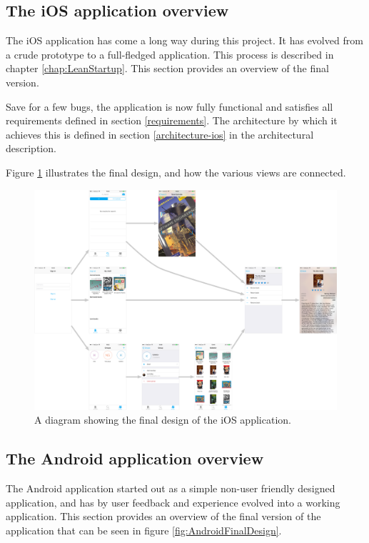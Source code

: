 \subsection{The iOS application overview}
\label{ios-conclusion}
The iOS application has come a long way during this project. It has evolved from a crude prototype to a full-fledged application. This process is described in chapter \ref{chap:LeanStartup}. This section provides an overview of the final version.

Save for a few bugs, the application is now fully functional and satisfies all  requirements defined in section \ref{requirements}. The architecture by which it achieves this is defined in section \ref{architecture-ios} in the architectural description.

Figure \ref{fig:navigation-tree-ios-6} illustrates the final design, and how the various views are connected.

\begin{figure}
    \begin{center}
        \includegraphics[width=\textwidth,keepaspectratio]{figs/v06/iOS/navigation-tree-ios.png}
        \caption{A diagram showing the final design of the iOS application.}
        \label{fig:navigation-tree-ios-6}
    \end{center}
\end{figure}



\subsection{The Android application overview}
\label{android-conclusion}
The Android application started out as a simple non-user friendly designed application, and has by user feedback and experience evolved into a working application. This section provides an overview of the final version of the application that can be seen in figure \ref{fig:AndroidFinalDesign}. 

